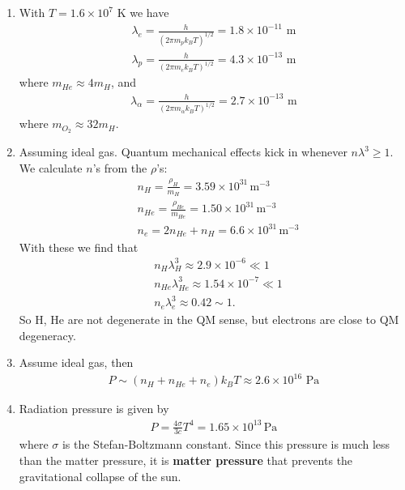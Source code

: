 \documentclass{article}
\theoremstyle{definition}
\newcommand{\al}{\alpha}
\newcommand{\f}[2]{\frac{#1}{#2}}
\begin{document}
\begin{enumerate}[label=(\alph*)]
	\item With $T = 1.6 \times 10^7$ K we have
	\begin{align*}
	\lambda_{e} =  \f{h}{(2\pi m_p k_B T)^{1/2}} = \boxed{1.8\times 10^{-11} \text{ m}}
	\end{align*}
	\begin{align*}
	\lambda_{p} =  \f{h}{(2\pi m_{e} k_B T)^{1/2}} = \boxed{4.3\times 10^{-13} \text{ m}} 
	\end{align*}
	where $m_{He} \approx 4 m_H$, and 
	\begin{align*}
	\lambda_{\al} = \f{h}{(2\pi m_\al k_B T)^{1/2}} = \boxed{2.7\times 10^{-13} \text{ m}}
	\end{align*}
	where $m_{O_2} \approx 32 m_H$. 
	
	
	
	\item Assuming ideal gas. Quantum mechanical effects kick in whenever $n\lambda^3 \geq 1$. We calculate $n$'s from the $\rho$'s:
	\begin{align*}
	&n_H = \f{\rho_H}{m_H} = \boxed{3.59\times 10^{31} \, \text{m}^{-3}}\\
	&n_{He} = \f{\rho_{He}}{m_{He}} = \boxed{1.50\times 10^{31} \, \text{m}^{-3}} \\
	&n_e = 2n_{He} + n_{H} = \boxed{6.6 \times 10^{31}\, \text{m}^{-3}}
	\end{align*}
	With these we find that
	\begin{align*}
	&n_H \lambda_H^3 \approx 2.9 \times 10^{-6} \ll 1\\
	&n_{He}\lambda^{3}_{He} \approx 1.54\times 10^{-7} \ll 1\\
	&n_e \lambda_e^3 \approx 0.42 \sim 1.
	\end{align*}
	So H, He are not degenerate in the QM sense, but electrons are close to QM degeneracy. 
	
	
	
	\item Assume ideal gas, then 
	\begin{align*}
	P \sim (n_H + n_{He} + n_e) k_BT \approx \boxed{2.6\times 10^{16} \text{ Pa}}
	\end{align*}
	
	
	
	
	\item Radiation pressure is given by 
	\begin{align*}
	P = \f{4\sigma}{3c}T^4 = \boxed{1.65\times 10^{13} \,\text{Pa}}
	\end{align*} 
	where $\sigma$ is the Stefan-Boltzmann constant. Since this pressure is much less than the matter pressure, it is \textbf{matter pressure} that prevents the gravitational collapse of the sun. 
\end{enumerate}
\end{document}
